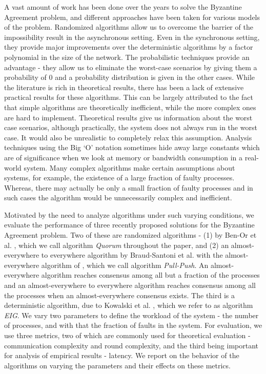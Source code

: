 A vast amount of work has been done over the years to solve the Byzantine Agreement problem, and different approaches have been taken for various models of the problem. Randomized algorithms allow us to overcome the barrier of the impossibility result in the asynchronous setting. Even in the synchronous setting, they provide major improvements over the deterministic algorithms by a factor polynomial in the size of the network. The probabilistic techniques provide an advantage - they allow us to eliminate the worst-case scenarios by giving them a probability of $0$ and a probability distribution is given in the other cases. While the literature is rich in theoretical results, there has been a lack of extensive practical results for these algorithms. This can be largely attributed to the fact that simple algorithms are theoretically inefficient, while the more complex ones are hard to implement. Theoretical results give us information about the worst case scenarios, although practically, the system does not always run in the worst case. It would also be unrealistic to completely relax this assumption. Analysis techniques using the Big `O' notation sometimes hide away large constants which are of significance when we look at memory or bandwidth consumption in a real-world system. Many complex algorithms make certain assumptions about systems, for example, the existence of a large fraction of faulty processes. Whereas, there may actually be only a small fraction of faulty processes and in such cases the algorithm would be unnecessarily complex and inefficient.

Motivated by the need to analyze algorithms under such varying conditions, we evaluate the performance of three recently proposed solutions for the Byzantine Agreement problem. Two of these are randomized algorithms - (1) by Ben-Or et al. \cite{BPV06}, which we call algorithm \textit{Quorum} throughout the paper, and (2) an almost-everywhere to everywhere algorithm by Braud-Santoni et al. \cite{BGH13} with the almost-everywhere algorithm of \cite{KSSV06}, which we call algorithm \textit{Pull-Push}. An almost-everywhere algorithm reaches consensus among all but a fraction of the processes and an almost-everywhere to everywhere algorithm reaches consensus among all the processes when an almost-everywhere consensus exists. The third is a deterministic algorithm, due to Kowalski et al. \cite{KM13}, which we refer to as algorithm \textit{EIG}. We vary two parameters to define the workload of the system - the number of processes, and with that the fraction of faults in the system. For evaluation, we use three metrics, two of which are commonly used for theoretical evaluation - communication complexity and round complexity, and the third being important for analysis of empirical results - latency. We report on the behavior of the algorithms on varying the parameters and their effects on these metrics. 

